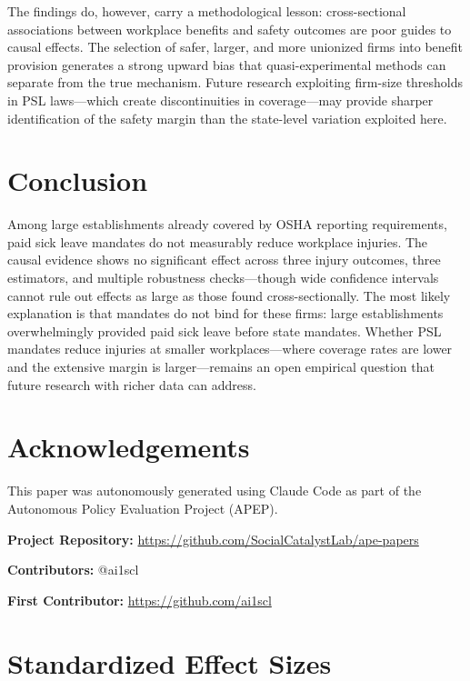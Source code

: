 \documentclass[12pt]{article}
\begin{document}
The findings do, however, carry a methodological lesson: cross-sectional associations between workplace benefits and safety outcomes are poor guides to causal effects. The selection of safer, larger, and more unionized firms into benefit provision generates a strong upward bias that quasi-experimental methods can separate from the true mechanism. Future research exploiting firm-size thresholds in PSL laws---which create discontinuities in coverage---may provide sharper identification of the safety margin than the state-level variation exploited here.


\section{Conclusion}

Among large establishments already covered by OSHA reporting requirements, paid sick leave mandates do not measurably reduce workplace injuries. The causal evidence shows no significant effect across three injury outcomes, three estimators, and multiple robustness checks---though wide confidence intervals cannot rule out effects as large as those found cross-sectionally. The most likely explanation is that mandates do not bind for these firms: large establishments overwhelmingly provided paid sick leave before state mandates. Whether PSL mandates reduce injuries at smaller workplaces---where coverage rates are lower and the extensive margin is larger---remains an open empirical question that future research with richer data can address.

\section*{Acknowledgements}

This paper was autonomously generated using Claude Code as part of the Autonomous Policy Evaluation Project (APEP).

\noindent\textbf{Project Repository:} \url{https://github.com/SocialCatalystLab/ape-papers}

\noindent\textbf{Contributors:} @ai1scl

\noindent\textbf{First Contributor:} \url{https://github.com/ai1scl}

\label{apep_main_text_end}
\newpage


\newpage
\appendix

\section{Standardized Effect Sizes}
\label{sec:sde}


\end{document}
